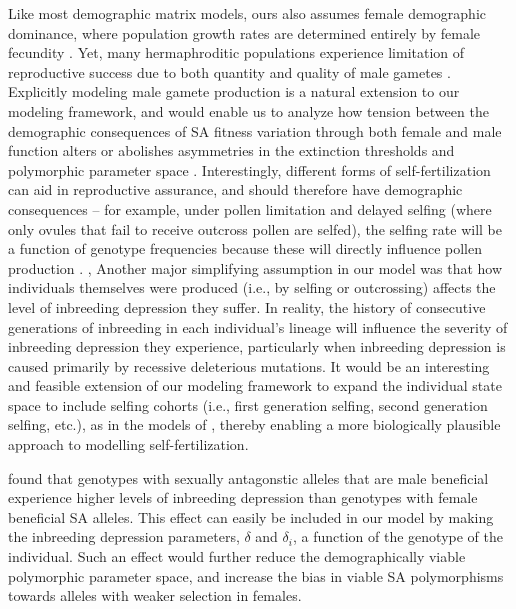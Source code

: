 \documentclass[11pt,draft]{article}
\begin{document}
Like most demographic matrix models, ours also assumes female demographic dominance, where population growth rates are determined entirely by female fecundity \citep{pollard1975mathematical,Caswell2001,iannelli2005gender}. Yet, many hermaphroditic populations experience limitation of reproductive success due to both quantity and quality of male gametes \citep[e.g.,][]{Yund2000,AizenHarder2007, Harder2016}. Explicitly modeling male gamete production is a natural extension to our modeling framework, and would enable us to analyze how tension between the demographic consequences of SA fitness variation through both female and male function alters or abolishes asymmetries in the extinction thresholds and polymorphic parameter space \citep[e.g.,][]{Tazzyman2015}.  Interestingly, different forms of self-fertilization can aid in reproductive assurance, and should therefore have demographic consequences -- for example, under pollen limitation and delayed selfing (where only ovules that fail to receive outcross pollen are selfed), the selfing rate will be a function of genotype frequencies because these will directly influence pollen production \citep{HarderBarrett2006}.
,
Another major simplifying assumption in our model was that how individuals themselves were produced (i.e., by selfing or outcrossing) affects the level of inbreeding depression they suffer. In reality, the history of consecutive generations of inbreeding in each individual's lineage will influence the severity of inbreeding depression they experience, particularly when inbreeding depression is caused primarily by recessive deleterious mutations. It would be an interesting and feasible extension of our modeling framework to expand the individual state space to include selfing cohorts (i.e., first generation selfing, second generation selfing, etc.), as in the models of \citet{kelly1999response,kelly2007mutation}, thereby enabling a more biologically plausible approach to modelling self-fertilization.

\cite{grieshop2017male} found that genotypes with sexually antagonstic alleles that are male beneficial experience higher levels of inbreeding depression than genotypes with female beneficial SA alleles. This effect can easily be included in our model by making the inbreeding depression parameters, $\delta$ and $\delta_i$, a function of the genotype of the individual. Such an effect would further reduce the demographically viable polymorphic parameter space, and increase the bias in viable SA polymorphisms towards alleles with weaker selection in females.
\end{document}

